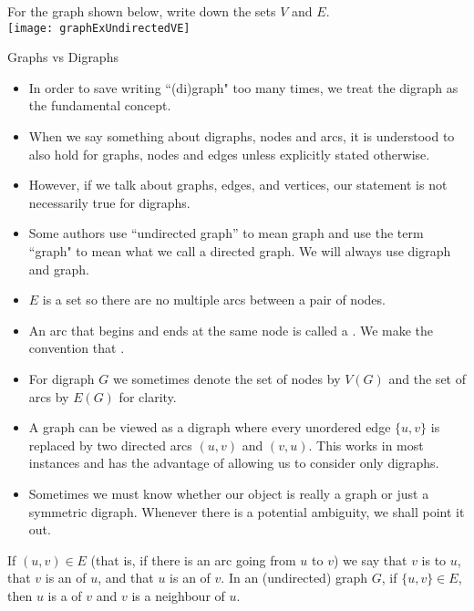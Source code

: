 \begin{Boxample}[0] \label{ex:graph}
For the graph shown below, write down the sets $V$ and $E$.\\
\newline 
\texttt{[image: graphExUndirectedVE]}
\end{Boxample}




\begin{note}
Graphs vs Digraphs
\begin{itemize}
  \item In order to save writing ``(di)graph" too many times, we treat the digraph as the fundamental concept.
  \item When we say something about digraphs, nodes and arcs, it is understood to also hold for graphs, nodes and edges unless explicitly stated otherwise. 
  \item However, if we talk about graphs, edges, and vertices, our statement is not necessarily true for digraphs. 
  \item Some authors use ``undirected graph'' to mean graph and use the term ``graph" to mean what we call a directed graph. We will always use digraph and graph.
  \item $E$ is a set so there are no multiple arcs between a pair of nodes.
 \item  An arc that begins and ends at the same node is called a . 
  We make the convention that . 
  \item For digraph $G$ we sometimes denote the set of nodes by $V(G)$
  and the set of arcs by $E(G)$ for clarity.
  \item A graph can be viewed as a digraph where every unordered edge $\{u, v\}$ 
  is replaced by two directed arcs $(u, v)$ and $(v, u)$.  
  This works in most instances and has the advantage of allowing us to consider only digraphs.
  \item Sometimes we must know whether our object is really a graph or just a symmetric digraph. Whenever there
  is a potential ambiguity, we shall point it out.
 \end{itemize}
\end{note}


\begin{Definition}\label{def:adjacent}  
If $(u, v)\in E$ (that is, if there is an arc going from $u$ to $v$) we say that $v$ is  
to $u$, that $v$ is an  of $u$, and that $u$ is an  of $v$.
In an (undirected) graph $G$, if $\{u, v\} \in E$, then $u$ is a  of $v$ and $v$ is a neighbour of $u$. 
\end{Definition}

